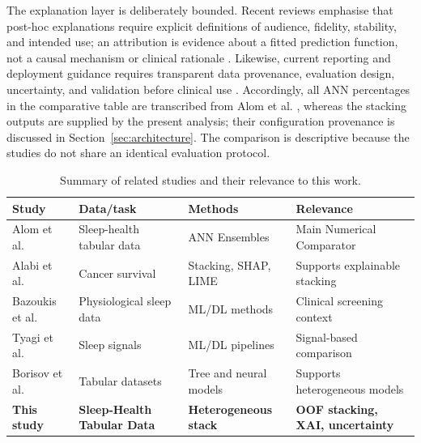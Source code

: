\documentclass[a4paper,fleqn]{cas-dc}
\begin{document}
The explanation layer is deliberately bounded. Recent reviews emphasise that post-hoc explanations require explicit definitions of audience, fidelity, stability, and intended use; an attribution is evidence about a fitted prediction function, not a causal mechanism or clinical rationale \cite{jung2023,allen2024}. Likewise, current reporting and deployment guidance requires transparent data provenance, evaluation design, uncertainty, and validation before clinical use \cite{tripodai2024,futureai2025}. Accordingly, all ANN percentages in the comparative table are transcribed from Alom et al. \cite{alom2024}, whereas the stacking outputs are supplied by the present analysis; their configuration provenance is discussed in Section~\ref{sec:architecture}. The comparison is descriptive because the studies do not share an identical evaluation protocol.
\begin{table}[width=\textwidth,pos=!tbp]
\centering
\caption{Summary of related studies and their relevance to this work.}
\label{tab:related_work}
\small
\setlength{\tabcolsep}{4pt}
\renewcommand{\arraystretch}{1.05}
\begin{tabularx}{\textwidth}{@{}Q{0.18\textwidth}Q{0.22\textwidth}Q{0.23\textwidth}Y@{}}
\toprule
Study & Data/task & Methods & Relevance \\
\midrule

Alom et al. \cite{alom2024} &
Sleep-health tabular data &
ANN Ensembles &
Main Numerical Comparator \\

Alabi et al. \cite{alabi2023} &
Cancer survival &
Stacking, SHAP, LIME &
Supports explainable stacking \\

Bazoukis et al. \cite{bazoukis2023} &
Physiological sleep data &
ML/DL methods &
Clinical screening context \\

Tyagi et al. \cite{tyagi2023} &
Sleep signals &
ML/DL pipelines &
Signal-based comparison \\

Borisov et al. \cite{borisov2024} &
Tabular datasets &
Tree and neural models &
Supports heterogeneous models \\

\textbf{This study} &
\textbf{Sleep-Health Tabular Data} &
\textbf{Heterogeneous stack} &
\textbf{OOF stacking, XAI, uncertainty} \\

\bottomrule
\end{tabularx}
\end{table}
\end{document}
